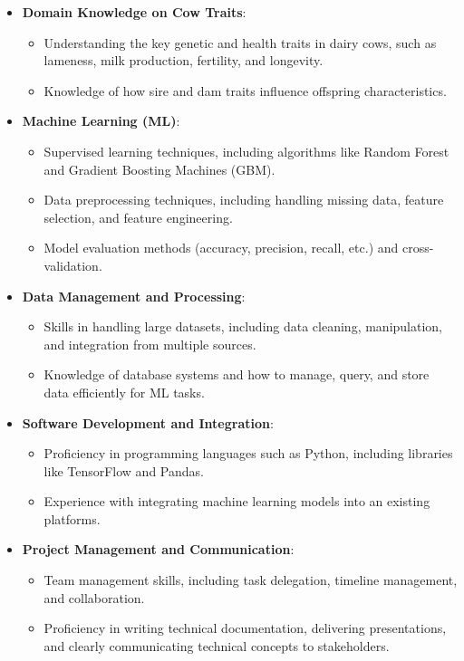 \documentclass[12pt]{article}
\begin{document}
\begin{itemize}
    \item \textbf{Domain Knowledge on Cow Traits}:
    \begin{itemize}
        \item Understanding the key genetic and health traits in dairy cows, 
        such as lameness, milk production, fertility, and longevity.
        \item Knowledge of how sire and dam traits influence offspring 
        characteristics.
    \end{itemize}

    \item \textbf{Machine Learning (ML)}:
    \begin{itemize}
        \item Supervised learning techniques, including algorithms like Random 
        Forest and Gradient Boosting Machines (GBM).
        \item Data preprocessing techniques, including handling missing data, 
        feature selection, and feature engineering.
        \item Model evaluation methods (accuracy, precision, recall, etc.) and 
        cross-validation.
    \end{itemize}

    \item \textbf{Data Management and Processing}:
    \begin{itemize}
        \item Skills in handling large datasets, including data cleaning, 
        manipulation, and integration from multiple sources.
        \item Knowledge of database systems and how to manage, query, and store 
        data efficiently for ML tasks.
    \end{itemize}

    \item \textbf{Software Development and Integration}:
    \begin{itemize}
        \item Proficiency in programming languages such as Python, including 
        libraries like TensorFlow and Pandas.
        \item Experience with integrating machine learning models into an 
        existing platforms.
    \end{itemize}

    \item \textbf{Project Management and Communication}:
    \begin{itemize}
        \item Team management skills, including task delegation, timeline 
        management, and collaboration.
        \item Proficiency in writing technical documentation, delivering 
        presentations, and clearly communicating technical concepts to 
        stakeholders.
    \end{itemize}
\end{itemize}
\end{document}

